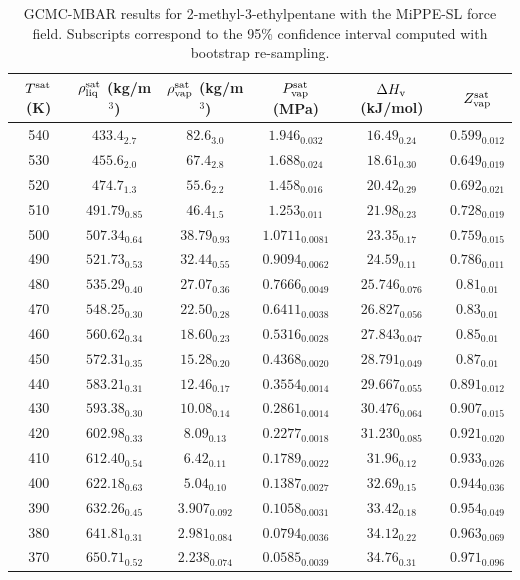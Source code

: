 \documentclass[journal=jctc,manuscript=article]{achemso}
\begin{document}
\begin{table}[htb!]
	\caption{GCMC-MBAR results for 2-methyl-3-ethylpentane with the MiPPE-SL force field. Subscripts correspond to the 95\% confidence interval computed with bootstrap re-sampling.}
	\begin{center}
		\begin{tabular}{|c|c|c|c|c|c|}
			\hline
			$T^{\rm sat}$ (K) & $\rho_{\rm liq}^{\rm sat}$ (kg/m$^3$) & $\rho_{\rm vap}^{\rm sat}$ (kg/m$^3$) & $P_{\rm vap}^{\rm sat}$ (MPa) & $\Delta H_{\rm v}$ (kJ/mol) & $Z_{\rm vap}^{\rm sat}$ \\ \hline
			540 & $433.4_{2.7}$ & $82.6_{3.0}$ & $1.946_{0.032}$ & $16.49_{0.24}$ & $0.599_{0.012}$ \\
			530 & $455.6_{2.0}$ & $67.4_{2.8}$ & $1.688_{0.024}$ & $18.61_{0.30}$ & $0.649_{0.019}$ \\
			520 & $474.7_{1.3}$ & $55.6_{2.2}$ & $1.458_{0.016}$ & $20.42_{0.29}$ & $0.692_{0.021}$ \\
			510 & $491.79_{0.85}$ & $46.4_{1.5}$ & $1.253_{0.011}$ & $21.98_{0.23}$ & $0.728_{0.019}$ \\
			500 & $507.34_{0.64}$ & $38.79_{0.93}$ & $1.0711_{0.0081}$ & $23.35_{0.17}$ & $0.759_{0.015}$ \\
			490 & $521.73_{0.53}$ & $32.44_{0.55}$ & $0.9094_{0.0062}$ & $24.59_{0.11}$ & $0.786_{0.011}$ \\
			480 & $535.29_{0.40}$ & $27.07_{0.36}$ & $0.7666_{0.0049}$ & $25.746_{0.076}$ & $0.81_{0.01}$ \\
			470 & $548.25_{0.30}$ & $22.50_{0.28}$ & $0.6411_{0.0038}$ & $26.827_{0.056}$ & $0.83_{0.01}$ \\
			460 & $560.62_{0.34}$ & $18.60_{0.23}$ & $0.5316_{0.0028}$ & $27.843_{0.047}$ & $0.85_{0.01}$ \\
			450 & $572.31_{0.35}$ & $15.28_{0.20}$ & $0.4368_{0.0020}$ & $28.791_{0.049}$ & $0.87_{0.01}$ \\
			440 & $583.21_{0.31}$ & $12.46_{0.17}$ & $0.3554_{0.0014}$ & $29.667_{0.055}$ & $0.891_{0.012}$ \\
			430 & $593.38_{0.30}$ & $10.08_{0.14}$ & $0.2861_{0.0014}$ & $30.476_{0.064}$ & $0.907_{0.015}$ \\
			420 & $602.98_{0.33}$ & $8.09_{0.13}$ & $0.2277_{0.0018}$ & $31.230_{0.085}$ & $0.921_{0.020}$ \\
			410 & $612.40_{0.54}$ & $6.42_{0.11}$ & $0.1789_{0.0022}$ & $31.96_{0.12}$ & $0.933_{0.026}$ \\
			400 & $622.18_{0.63}$ & $5.04_{0.10}$ & $0.1387_{0.0027}$ & $32.69_{0.15}$ & $0.944_{0.036}$ \\
			390 & $632.26_{0.45}$ & $3.907_{0.092}$ & $0.1058_{0.0031}$ & $33.42_{0.18}$ & $0.954_{0.049}$ \\
			380 & $641.81_{0.31}$ & $2.981_{0.084}$ & $0.0794_{0.0036}$ & $34.12_{0.22}$ & $0.963_{0.069}$ \\
			370 & $650.71_{0.52}$ & $2.238_{0.074}$ & $0.0585_{0.0039}$ & $34.76_{0.31}$ & $0.971_{0.096}$ \\
			\hline
		\end{tabular}
	\end{center}
\end{table}
\end{document}
